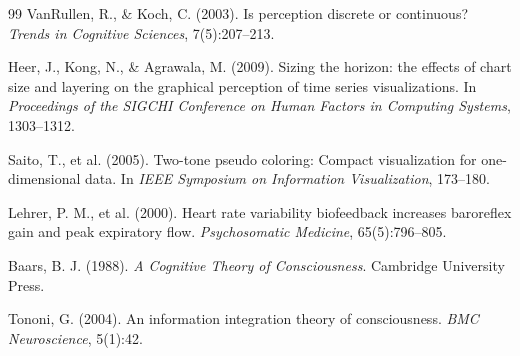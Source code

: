 \documentclass[12pt]{article}
\theoremstyle{remark}
\begin{document}
\begin{thebibliography}{99}
VanRullen, R., \& Koch, C. (2003). Is perception discrete or continuous? \textit{Trends in Cognitive Sciences}, 7(5):207--213.

Heer, J., Kong, N., \& Agrawala, M. (2009). Sizing the horizon: the effects of chart size and layering on the graphical perception of time series visualizations. In \textit{Proceedings of the SIGCHI Conference on Human Factors in Computing Systems}, 1303--1312.

Saito, T., et al. (2005). Two-tone pseudo coloring: Compact visualization for one-dimensional data. In \textit{IEEE Symposium on Information Visualization}, 173--180.

Lehrer, P. M., et al. (2000). Heart rate variability biofeedback increases baroreflex gain and peak expiratory flow. \textit{Psychosomatic Medicine}, 65(5):796--805.

Baars, B. J. (1988). \textit{A Cognitive Theory of Consciousness}. Cambridge University Press.

Tononi, G. (2004). An information integration theory of consciousness. \textit{BMC Neuroscience}, 5(1):42.

\end{thebibliography}
\end{document}
